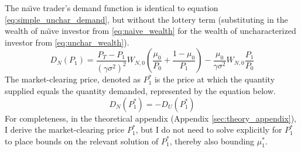 \documentclass[12pt]{article}
\begin{document}

The na\"{\i}ve trader's demand function is identical to equation \eqref{eq:simple_unchar_demand}, but without the lottery term (substituting in the wealth of na\"{\i}ve investor from \eqref{eq:naive_wealth} for the wealth of uncharacterized investor from \eqref{eq:unchar_wealth}).
\begin{equation}
    D_N(P_1) = \frac{P_T - P_1}{(\gamma \sigma^2)^2}W_{N,0}\left(\frac{\mu_0}{P_0} + \frac{1- \mu_0}{P_1}\right) - \frac{\mu_0}{\gamma \sigma^2}W_{N,0}\frac{P_1}{P_0}
    \label{eq:simple_naive_demand}
\end{equation}
The market-clearing price, denoted as $P_1^*$ is the price at which the quantity supplied equals the quantity demanded, represented by the equation below.
\begin{equation}
    D_N(P_{1}^*) = -D_U(P_{1}^*) 
    \label{eq:supply_demand}
\end{equation}
For completeness, in the theoretical appendix (Appendix \ref{sec:theory_appendix}), I derive the market-clearing price $P_1^*$, but I do not need to solve explicitly for $P_1^*$ to place bounds on the relevant solution of $P_1^*$, thereby also bounding $\mu_1^*$.
\end{document}
